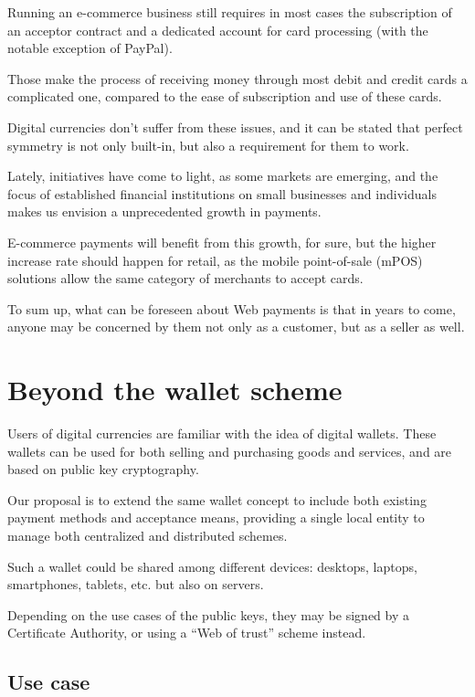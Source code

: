 Running an e-commerce business still requires in most cases the
subscription of an acceptor contract and a dedicated account for card
processing (with the notable exception of PayPal).

Those make the process of receiving money through most debit and credit
cards a complicated one, compared to the ease of subscription and use of
these cards.

Digital currencies don't suffer from these issues, and it can be stated
that perfect symmetry is not only built-in, but also a requirement for
them to work.

Lately, initiatives have come to light, as some markets are emerging,
and the focus of established financial institutions on small businesses
and individuals makes us envision a unprecedented growth in payments.

E-commerce payments will benefit from this growth, for sure, but the
higher increase rate should happen for retail, as the mobile
point-of-sale (mPOS) solutions allow the same category of merchants to
accept cards.

To sum up, what can be foreseen about Web payments is that in years to
come, anyone may be concerned by them not only as a customer, but as a
seller as well.

\section{Beyond the wallet scheme}\label{beyond-the-wallet-scheme}

Users of digital currencies are familiar with the idea of digital
wallets. These wallets can be used for both selling and purchasing goods
and services, and are based on public key cryptography.

Our proposal is to extend the same wallet concept to include both
existing payment methods and acceptance means, providing a single local
entity to manage both centralized and distributed schemes.

Such a wallet could be shared among different devices: desktops,
laptops, smartphones, tablets, etc. but also on servers.

Depending on the use cases of the public keys, they may be signed by a
Certificate Authority, or using a ``Web of trust'' scheme instead.

\subsection{Use case}\label{use-case}

